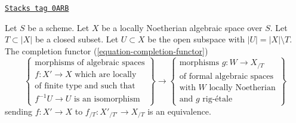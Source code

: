 \begin{theorem}
\label{restricted-theorem-dilatations-general}
\href{https://stacks.math.columbia.edu/tag/0ARB}{\texttt{Stacks tag 0ARB}}

Let $S$ be a scheme. Let $X$ be a locally Noetherian algebraic space over $S$.
Let $T \subset |X|$ be a closed subset. Let $U \subset X$ be the open subspace
with $|U| = |X| \setminus T$. The completion functor
(\ref{equation-completion-functor})
$$
\left\{
\begin{matrix}
\text{morphisms of algebraic spaces}\\
f : X' \to X\text{ which are locally}\\
\text{of finite type and such that}\\
f^{-1}U \to U\text{ is an isomorphism}
\end{matrix}
\right\}
\longrightarrow
\left\{
\begin{matrix}
\text{morphisms }g : W \to X_{/T}\\
\text{of formal algebraic spaces}\\
\text{with }W\text{ locally Noetherian}\\
\text{and }g\text{ rig-\'etale}
\end{matrix}
\right\}
$$
sending $f : X' \to X$ to $f_{/T} : X'_{/T'} \to X_{/T}$ is an equivalence.
\end{theorem}

